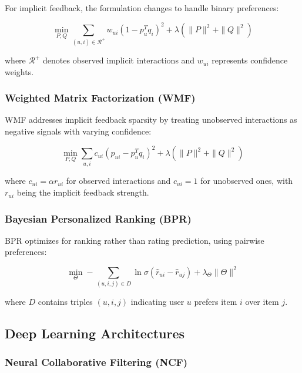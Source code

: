 \documentclass[acmsmall,review,anonymous]{acmart}
\begin{document}
For implicit feedback, the formulation changes to handle binary preferences:

\begin{equation}
\min_{P,Q} \sum_{(u,i) \in \mathcal{R}^+} w_{ui} (1 - p_u^T q_i)^2 + \lambda (\|P\|^2 + \|Q\|^2)
\label{eq:implicit_mf}
\end{equation}

where $\mathcal{R}^+$ denotes observed implicit interactions and $w_{ui}$ represents confidence weights.

\subsubsection{Weighted Matrix Factorization (WMF)}

WMF addresses implicit feedback sparsity by treating unobserved interactions as negative signals with varying confidence:

\begin{equation}
\min_{P,Q} \sum_{u,i} c_{ui} (p_{ui} - p_u^T q_i)^2 + \lambda (\|P\|^2 + \|Q\|^2)
\label{eq:wmf}
\end{equation}

where $c_{ui} = \alpha r_{ui}$ for observed interactions and $c_{ui} = 1$ for unobserved ones, with $r_{ui}$ being the implicit feedback strength.

\subsubsection{Bayesian Personalized Ranking (BPR)}

BPR optimizes for ranking rather than rating prediction, using pairwise preferences:

\begin{equation}
\min_{\Theta} -\sum_{(u,i,j) \in D} \ln \sigma(\hat{r}_{ui} - \hat{r}_{uj}) + \lambda_\Theta \|\Theta\|^2
\label{eq:bpr}
\end{equation}

where $D$ contains triples $(u,i,j)$ indicating user $u$ prefers item $i$ over item $j$.

\subsection{Deep Learning Architectures}

\subsubsection{Neural Collaborative Filtering (NCF)}
\end{document}
